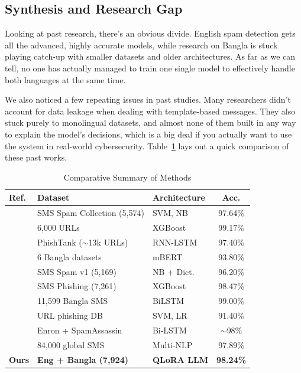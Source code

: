 \documentclass[journal]{IEEEtran}
\begin{document}
\subsection{Synthesis and Research Gap}

Looking at past research, there's an obvious divide. English spam detection gets all the advanced, highly accurate models, while research on Bangla is stuck playing catch-up with smaller datasets and older architectures. As far as we can tell, no one has actually managed to train one single model to effectively handle both languages at the same time.

We also noticed a few repeating issues in past studies. Many researchers didn't account for data leakage when dealing with template-based messages. They also stuck purely to monolingual datasets, and almost none of them built in any way to explain the model's decisions, which is a big deal if you actually want to use the system in real-world cybersecurity. Table~\ref{tab:comparative} lays out a quick comparison of these past works.

\begin{table}[htbp]
\caption{Comparative Summary of Methods}
\label{tab:comparative}
\centering
\begin{tabular}{lllc}
\toprule
\textbf{Ref.} & \textbf{Dataset} & \textbf{Architecture} & \textbf{Acc.} \\
\midrule
\cite{ref1} & SMS Spam Collection (5,574) & SVM, NB & 97.64\% \\
\cite{ref2} & 6,000 URLs & XGBoost & 99.17\% \\
\cite{ref3} & PhishTank ($\sim$13k URLs) & RNN-LSTM & 97.40\% \\
\cite{ref4} & 6 Bangla datasets & mBERT & 93.80\% \\
\cite{ref5} & SMS Spam v1 (5,169) & NB + Dict. & 96.20\% \\
\cite{ref6} & SMS Phishing (7,261) & XGBoost & 98.47\% \\
\cite{ref7} & 11,599 Bangla SMS & BiLSTM & 99.00\% \\
\cite{ref8} & URL phishing DB & SVM, LR & 91.40\% \\
\cite{ref9} & Enron + SpamAssassin & Bi-LSTM & $\sim$98\% \\
\cite{ref10} & 84,000 global SMS & Multi-NLP & 97.89\% \\
\textbf{Ours} & \textbf{Eng + Bangla (7,924)} & \textbf{QLoRA LLM} & \textbf{98.24\%} \\
\bottomrule
\end{tabular}
\end{table}
\end{document}
